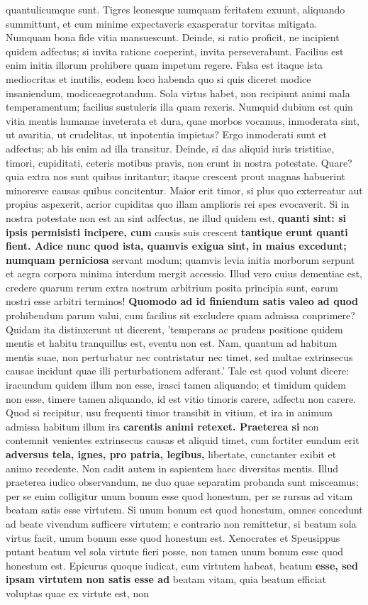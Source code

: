 quantulicumque sunt. Tigres leonesque numquam feritatem exuunt, aliquando summittunt, et cum minime expectaveris exasperatur torvitas mitigata. Numquam bona fide vitia mansuescunt. Deinde, si ratio proficit, ne incipient quidem adfectus; si invita ratione coeperint, invita perseverabunt. Facilius est enim initia illorum prohibere quam impetum regere. Falsa est itaque ista mediocritas et inutilis, eodem loco habenda quo si quis diceret modice insaniendum, modiceaegrotandum. Sola virtus habet, non recipiunt animi mala temperamentum; facilius sustuleris illa quam rexeris. Numquid dubium est quin vitia mentis humanae inveterata et dura, quae morbos vocamus, inmoderata sint, ut avaritia, ut crudelitas, ut inpotentia impietas? Ergo inmoderati sunt et adfectus; ab his enim ad illa transitur. Deinde, si das aliquid iuris tristitiae, timori, cupiditati, ceteris motibus pravis, non erunt in nostra potestate. Quare? quia extra nos sunt quibus inritantur; itaque crescent prout magnas habuerint minoresve causas quibus concitentur. Maior erit timor, si plus quo exterreatur aut propius aspexerit, acrior cupiditas quo illam amplioris rei spes evocaverit. Si in nostra potestate non est an sint adfectus, ne illud quidem est, \textbf{quanti sint: si ipsis permisisti incipere, cum} causis suis crescent \textbf{tantique erunt quanti fient. \textbf{Adice nunc quod} ista, quamvis exigua sint,} \textbf{in maius excedunt; numquam perniciosa} servant modum; quamvis levia initia morborum serpunt et aegra corpora minima interdum mergit accessio. Illud vero cuius dementiae est, credere quarum rerum extra nostrum arbitrium posita principia sunt, earum nostri esse arbitri terminos! \textbf{Quomodo ad id finiendum satis valeo ad quod} prohibendum parum valui, cum facilius sit excludere quam admissa conprimere? Quidam ita distinxerunt ut dicerent, 'temperans ac prudens positione quidem mentis et habitu tranquillus est, eventu non est. Nam, quantum ad habitum mentis suae, non perturbatur nec contristatur nec timet, sed multae extrinsecus causae incidunt quae illi perturbationem adferant.' Tale est quod volunt dicere: iracundum quidem illum non esse, irasci tamen aliquando; et timidum quidem non esse, timere tamen aliquando, id est vitio timoris carere, adfectu non carere. Quod si recipitur, usu frequenti timor transibit in vitium, et ira in animum admissa habitum illum ira \textbf{carentis animi retexet. Praeterea si} non contemnit venientes extrinsecus causas et aliquid timet, cum fortiter eundum erit \textbf{adversus tela, ignes, pro patria, legibus,} libertate, cunctanter exibit et animo recedente. Non cadit autem in sapientem haec diversitas mentis. Illud praeterea iudico observandum, ne duo quae separatim probanda sunt misceamus; per se enim colligitur unum bonum esse quod honestum, per se rursus ad vitam beatam satis esse virtutem. Si unum bonum est quod honestum, omnes concedunt ad beate vivendum sufficere virtutem; e contrario non remittetur, si beatum sola virtus facit, unum bonum esse quod honestum est. Xenocrates et Speusippus putant beatum vel sola virtute fieri posse, non tamen unum bonum esse quod honestum est. Epicurus quoque iudicat, cum virtutem habeat, beatum \textbf{\textbf{esse, sed ipsam virtutem non satis esse} ad} beatam vitam, quia beatum efficiat voluptas quae ex virtute est, non 